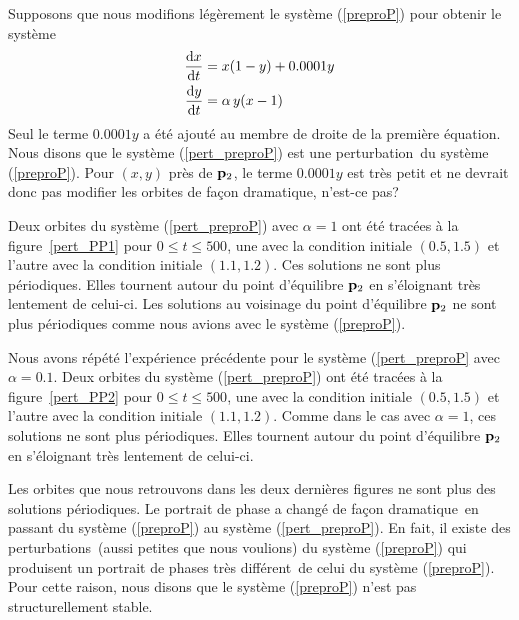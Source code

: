 {Supposons que nous modifions légèrement le système (\ref{preproP}) pour
obtenir le système
\begin{equation} \label{pert_preproP}
\begin{split}
\frac{\mathrm{d}x}{\mathrm{d}t} &= x(1-y) + 0.0001 y\\
\frac{\mathrm{d}y}{\mathrm{d}t} &= \alpha \,y(x - 1)
\end{split}
\end{equation}
Seul le terme $0.0001 y$ a été ajouté au membre de droite de
la première équation.  Nous disons que le système (\ref{pert_preproP})
est une \flqq perturbation\frqq\ du système (\ref{preproP}).    Pour
$(x,y)$ près de $\mathbf{p}_2$, le terme $0.0001 y$ est très petit et ne
devrait donc pas modifier les orbites de façon dramatique, n'est-ce
pas?

Deux orbites du système (\ref{pert_preproP}) avec $\alpha=1$ ont été
tracées à la figure~\ref{pert_PP1} pour $0 \leq t \leq 500$, une
avec la condition initiale $(0.5,1.5)$ et l'autre avec la condition
initiale $(1.1,1.2)$.  Ces solutions ne sont plus périodiques.
Elles tournent autour du point d'équilibre $\mathbf{p}_2$ en s'éloignant
très lentement de celui-ci.  Les solutions au voisinage du
point d'équilibre $\mathbf{p}_2$ ne sont plus périodiques comme nous
avions avec le système (\ref{preproP}).

Nous avons répété l'expérience précédente pour le système
(\ref{pert_preproP} avec $\alpha=0.1$.  Deux orbites du système
(\ref{pert_preproP}) ont été tracées à la figure~\ref{pert_PP2}
pour $0 \leq t \leq 500$, une
avec la condition initiale $(0.5,1.5)$ et l'autre avec la condition
initiale $(1.1,1.2)$.  Comme dans le cas avec $\alpha =1$, ces
solutions ne sont plus périodiques.  Elles tournent autour du point
d'équilibre $\mathbf{p}_2$ en s'éloignant très lentement de celui-ci.

Les orbites que nous retrouvons dans les deux dernières
figures ne sont plus des solutions périodiques.  Le portrait de phase a
changé de façon \flqq dramatique\frqq\ en passant du système (\ref{preproP})
au système (\ref{pert_preproP}).  En fait, il existe des
\flqq perturbations\frqq\ (aussi petites que nous voulions) du système
(\ref{preproP}) qui produisent un portrait de phases très
\flqq différent\frqq\ de celui du système (\ref{preproP}).  Pour cette
raison, nous disons que le système (\ref{preproP}) n'est pas \flqq
structurellement stable\frqq.

}
